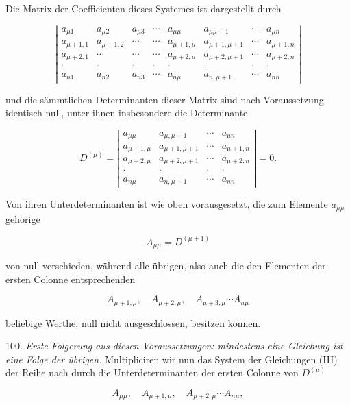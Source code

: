\documentclass[11pt]{article}
\providecommand{\weq}[2]{\begin{equation}\tag{#1}#2\end{equation}}
\begin{document}
Die Matrix der Coefficienten dieses Systemes ist dargestellt durch

\weq{A}{
\left|
\begin{array}{cccccccc}
a_{\mu1} & a_{\mu2} & a_{\mu3} & \cdots & a_{\mu\mu} & a_{\mu\mu+1} & \cdots & a_{\mu n}\\
a_{\mu+1,1} & a_{\mu+1,2} & \cdots & \cdots & a_{\mu+1,\mu} & a_{\mu+1,\mu+1} & \cdots & a_{\mu+1,n}\\
a_{\mu+2,1} & \cdots & \cdots & \cdots & a_{\mu+2,\mu} & a_{\mu+2,\mu+1} & \cdots & a_{\mu+2,n}\\
\cdot & \cdot & \cdot & \cdot & \cdot & \cdot & \cdot & \cdot\\
a_{n1} & a_{n2} & a_{n3} & \cdots & a_{n\mu} & a_{n,\mu+1} & \cdots & a_{nn}
\end{array}
\right|
}

und die sämmtlichen Determinanten dieser Matrix sind nach Voraussetzung
identisch null, unter ihnen insbesondere die Determinante

\[
D^{(\mu)}=
\left|
\begin{array}{cccc}
a_{\mu\mu} & a_{\mu,\mu+1} & \cdots & a_{\mu n}\\
a_{\mu+1,\mu} & a_{\mu+1,\mu+1} & \cdots & a_{\mu+1,n}\\
a_{\mu+2,\mu} & a_{\mu+2,\mu+1} & \cdots & a_{\mu+2,n}\\
\cdot & \cdot & \cdot & \cdot\\
a_{n\mu} & a_{n,\mu+1} & \cdots & a_{nn}
\end{array}
\right|=0.
\]

Von ihren Unterdeterminanten ist wie oben vorausgesetzt, die zum
Elemente $a_{\mu\mu}$ gehörige

\[
A_{\mu\mu}=D^{(\mu+1)}
\]

von null verschieden, während alle übrigen, also auch die den Elementen
der ersten Colonne entsprechenden

\[
A_{\mu+1,\mu},\quad A_{\mu+2,\mu},\quad A_{\mu+3,\mu}\cdots A_{n\mu}
\]

beliebige Werthe, null nicht ausgeschlossen, besitzen können.

100. \textit{Erste Folgerung aus diesen Voraussetzungen: mindestens
eine Gleichung ist eine Folge der übrigen.} Multipliciren wir nun das
System der Gleichungen (III) der Reihe nach durch die
Unterdeterminanten der ersten Colonne von $D^{(\mu)}$

\[
A_{\mu\mu},\quad A_{\mu+1,\mu},\quad A_{\mu+2,\mu}\cdots A_{n\mu},
\]
\end{document}
